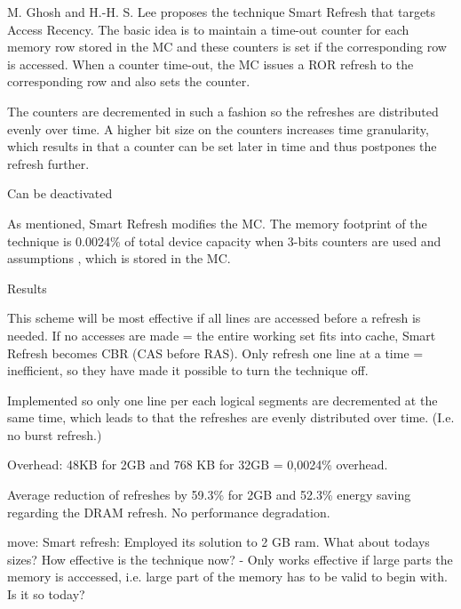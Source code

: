 
M. Ghosh and H.-H. S. Lee proposes the technique Smart Refresh \cite{smartrefresh} that targets Access Recency. The basic idea is to maintain a time-out counter for each memory row stored in the MC and these counters is set if the corresponding row is accessed. When a counter time-out, the MC issues a ROR refresh to the corresponding row and also sets the counter. 

The counters are decremented in such a fashion so the refreshes are distributed evenly over time. A higher bit size on the counters increases time granularity, which results in that a counter can be set later in time and thus postpones the refresh further. 

Can be deactivated

As mentioned, Smart Refresh modifies the MC. The memory footprint of the technique is 0.0024\% of total device capacity when 3-bits counters are used and assumptions , which is stored in the MC.

Results 




This scheme will be most effective if all lines are accessed before a refresh is needed. If no accesses are made = the entire working set fits into cache, Smart Refresh becomes CBR (CAS before RAS). Only refresh one line at a time = inefficient, so they have made it possible to turn the technique off.

Implemented so only one line per each logical segments are decremented at the same time, which leads to that the refreshes are evenly distributed over time. (I.e. no burst refresh.)

Overhead: 48KB for 2GB and 768 KB for 32GB = 0,0024\% overhead. 

Average reduction of refreshes by 59.3\% for 2GB and 52.3\% energy saving regarding the DRAM refresh. No performance degradation.

move:
Smart refresh:
Employed its solution to 2 GB ram. What about todays sizes? How effective is the technique now? - Only works effective if large parts the memory is acccessed, i.e. large part of the memory has to be valid to begin with. Is it so today?